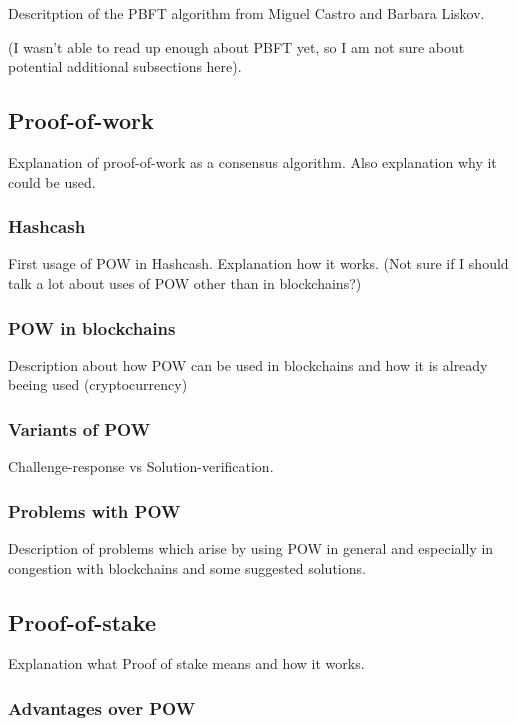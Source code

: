 \documentclass{acm_proc_article-sp}
\begin{document}
Descritption of the PBFT algorithm from Miguel Castro and Barbara Liskov.

(I wasn't able to read up enough about PBFT yet, so I am not sure about potential additional subsections here).


\subsection{Proof-of-work}

Explanation of proof-of-work as a consensus algorithm. Also explanation why it could be used.


\subsubsection{Hashcash}

First usage of POW in Hashcash. Explanation how it works. (Not sure if I should talk a lot about uses of POW other than in blockchains?)


\subsubsection{POW in blockchains}

Description about how POW can be used in blockchains and how it is already beeing used (cryptocurrency)


\subsubsection{Variants of POW}

Challenge-response vs Solution-verification.


\subsubsection{Problems with POW}

Description of problems which arise by using POW in general and especially in congestion with blockchains and some suggested solutions.


\subsection{Proof-of-stake}

Explanation what Proof of stake means and how it works.


\subsubsection{Advantages over POW}
\end{document}
